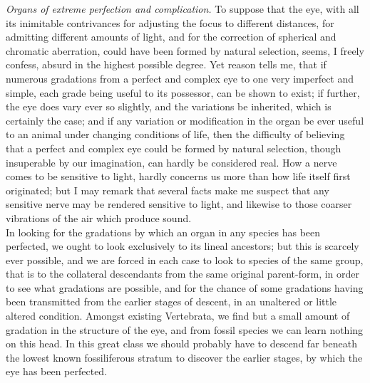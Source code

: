 \indent \emph{Organs of extreme perfection and complication.} To suppose that the eye, with all its inimitable contrivances for adjusting the focus to different distances, for admitting different amounts of light, and for the correction of spherical and chromatic aberration, could have been formed by natural selection, seems, I freely confess, absurd in the highest possible degree. Yet reason tells me, that if numerous gradations from a perfect and complex eye to one very imperfect and simple, each grade being useful to its possessor, can be shown to exist; if further, the eye does vary ever so slightly, and the variations be inherited, which is certainly the case; and if any variation or modification in the organ be ever useful to an animal under changing conditions of life, then the difficulty of believing that a perfect and complex eye could be formed by natural selection, though insuperable by our imagination, can hardly be considered real. How a nerve comes to be sensitive to light, hardly concerns us more than how life itself first originated; but I may remark that several facts make me suspect that any sensitive nerve may be rendered sensitive to light, and likewise to those coarser vibrations of the air which produce sound.\\
\indent In looking for the gradations by which an organ in any species has been perfected, we ought to look exclusively to its lineal ancestors; but this is scarcely ever possible, and we are forced in each case to look to species of the same group, that is to the collateral descendants from the same original parent-form, in order to see what gradations are possible, and for the chance of some gradations having been transmitted from the earlier stages of descent, in an unaltered or little altered condition. Amongst existing Vertebrata, we find but a small amount of gradation in the structure of the eye, and from fossil species we can learn nothing on this head. In this great class we should probably have to descend far beneath the lowest known fossiliferous stratum to discover the earlier stages, by which the eye has been perfected.\\
